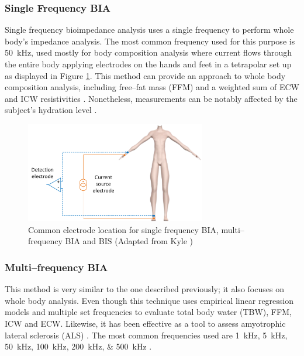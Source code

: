 \subsubsection{Single Frequency BIA}
Single frequency bioimpedance analysis uses a single frequency to perform whole body’s impedance analysis. The most common frequency used for this purpose is \SI{50}{\kilo\hertz}, used mostly for body composition analysis where current flows through the entire body applying electrodes on the hands and feet in a tetrapolar set up as displayed in Figure \ref{fig:single f BIA}. This method can provide an approach to whole body composition analysis, including free–fat mass (FFM) and a weighted sum of ECW and ICW resistivities \cite{kyle2004bioelectrical}. Nonetheless, measurements can be notably affected by the subject’s hydration level \cite{gudivaka1999single,schoeller2000bioelectrical}.

\begin{figure}[!htpb]
	\centering
	\includegraphics[width=0.7\textwidth,keepaspectratio]{figure12}    
	\caption[Common electrodes placement for whole body BIA and BIS]{Common electrode location for single frequency BIA, multi–frequency BIA and BIS (Adapted from Kyle \cite{kyle2004bioelectrical})}
	\label{fig:single f BIA}
\end{figure}

\subsubsection{Multi–frequency BIA}
This method is very similar to the one described previously; it also focuses on whole body analysis. Even though this technique uses empirical linear regression models and multiple set frequencies to evaluate total body water (TBW), FFM, ICW and ECW. Likewise, it has been effective as a tool to assess amyotrophic lateral sclerosis (ALS) \cite{wang2011electrical}. The most common frequencies used are \SIlist{1;5;50;100;200;500}{\kilo\hertz} \cite{kyle2004bioelectrical}. 

